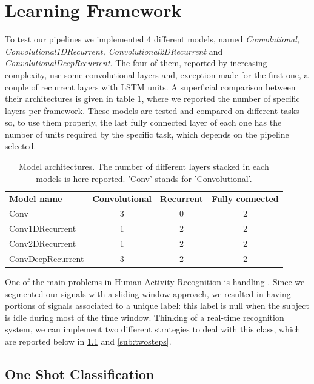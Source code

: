 \section{Learning Framework}
\label{sec:learning_framework}

To test our pipelines we implemented 4 different models, named \textit{Convolutional, Convolutional1DRecurrent, Convolutional2DRecurrent} and \textit{ConvolutionalDeepRecurrent}. The four of them, reported by increasing complexity, use some convolutional layers and, exception made for the first one, a couple of recurrent layers with LSTM units. A superficial comparison between their architectures is given in table \ref{tab:models}, where we reported the number of specific layers per framework.
These models are tested and compared on different tasks so, to use them properly, the last fully connected layer of each one has the number of units required by the specific task, which depends on the pipeline selected.

\begin{table}[]
	\begin{tabular}{lccc}
		\textbf{Model name}        & \textbf{Convolutional} & \textbf{Recurrent} & \textbf{Fully connected} \\
		Conv              & 3             & 0         & 2			   \\
		Conv1DRecurrent   & 1             & 2         & 2               \\
		Conv2DRecurrent   & 1             & 2         & 2               \\
		ConvDeepRecurrent & 3             & 2         & 2
	\end{tabular}
	\caption{Model architectures. The number of different layers stacked in each models is here reported. 'Conv' stands for 'Convolutional'.}
	\label{tab:models}
\end{table}

One of the main problems in Human Activity Recognition is handling . Since we segmented our signals with a sliding window approach, we resulted in having portions of signals associated to a unique label: this label is null when the subject is idle during most of the time window. Thinking of a real-time recognition system, we can implement two different strategies to deal with this class, which are reported below in \ref{sub:oneshot} and \ref{sub:twosteps}.

\subsection{One Shot Classification}
\label{sub:oneshot}


